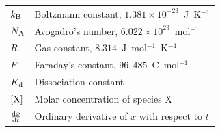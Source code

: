 \documentclass[12pt, a4paper, twoside, openright]{book}
\begin{document}
\begin{tabular}{ll}
  $k_{\mathrm{B}}$           & Boltzmann constant, $1.381\times10^{-23}$~J~K$^{-1}$ \\
  $N_{\mathrm{A}}$           & Avogadro's number, $6.022\times10^{23}$~mol$^{-1}$ \\
  $R$             & Gas constant, $8.314$~J~mol$^{-1}$~K$^{-1}$ \\
  $F$             & Faraday's constant, $96{,}485$~C~mol$^{-1}$ \\
  $K_{\mathrm{d}}$           & Dissociation constant \\
  $[\mathrm{X}]$      & Molar concentration of species X \\
  $\frac{\mathrm{d}x}{\mathrm{d}t}$     & Ordinary derivative of $x$ with respect to $t$ \\
\end{tabular}

\mainmatter

%

\backmatter

\end{document}
